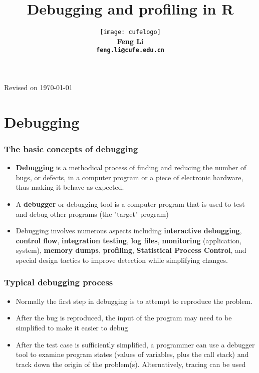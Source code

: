 \documentclass[10pt]{beamer}
\title[Statistical Computing]{{\textbf{Debugging and profiling in R}}}
\author[Feng Li]{\texttt{[image: cufelogo]}\\
  \vspace{0.5cm}\textbf{Feng Li\\\texttt{feng.li@cufe.edu.cn}}}
\institute[Stat \& Math, CUFE]{\footnotesize{\textbf{School of Statistics and
      Mathematics\\ Central University of Finance and Economics}}}
\begin{document}
\begin{frame}[plain]
  \titlepage
  \tiny{Revised on \today}
\end{frame}



\section{Debugging}

\begin{frame}
\frametitle{The basic concepts of debugging}

\begin{itemize}
\item \textbf{Debugging} is a methodical process of finding and reducing the number of bugs, or defects, in a computer program or a piece of electronic hardware, thus making it behave as expected.

\item A \textbf{debugger} or debugging tool is a computer program that
  is used to test and debug other programs (the "target" program)

\item Debugging involves numerous aspects including \textbf{interactive debugging}, \textbf{control flow}, \textbf{integration testing}, \textbf{log files}, \textbf{monitoring} (application, system), \textbf{memory dumps}, \textbf{profiling}, \textbf{Statistical Process Control}, and special design tactics to improve detection while simplifying changes.


\end{itemize}

\end{frame}

\begin{frame}
  \frametitle{Typical debugging process}

  \begin{itemize}
  \item Normally the first step in debugging is to attempt to
    reproduce the problem.

  \item After the bug is reproduced, the input of the program may need
    to be simplified to make it easier to debug

  \item After the test case is sufficiently simplified, a programmer
    can use a debugger tool to examine program states (values of
    variables, plus the call stack) and track down the origin of the
    problem(s). Alternatively, tracing can be used

  \end{itemize}
\end{frame}
\end{document}
